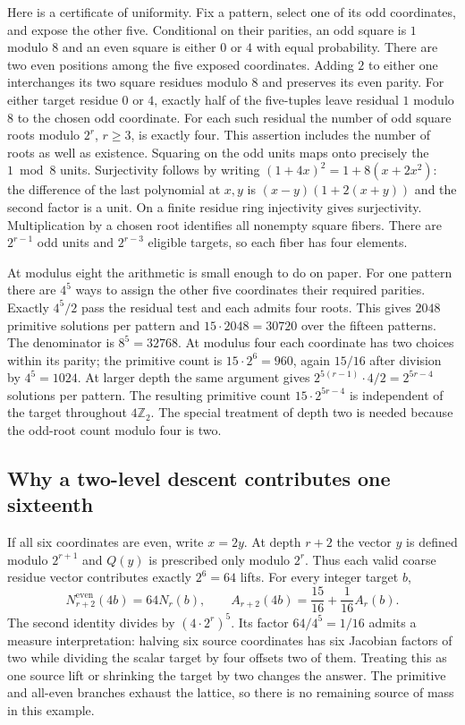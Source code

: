 \documentclass[12pt,letterpaper]{article}
\begin{document}
Here is a certificate of uniformity. Fix a pattern, select one of its odd coordinates, and expose the other five. Conditional on their parities, an odd square is $1$ modulo $8$ and an even square is either $0$ or $4$ with equal probability. There are two even positions among the five exposed coordinates. Adding $2$ to either one interchanges its two square residues modulo $8$ and preserves its even parity. For either target residue $0$ or $4$, exactly half of the five-tuples leave residual $1$ modulo $8$ to the chosen odd coordinate. For each such residual the number of odd square roots modulo $2^r$, $r\ge3$, is exactly four. This assertion includes the number of roots as well as existence. Squaring on the odd units maps onto precisely the $1\bmod8$ units. Surjectivity follows by writing $(1+4x)^2=1+8(x+2x^2)$: the difference of the last polynomial at $x,y$ is $(x-y)(1+2(x+y))$ and the second factor is a unit. On a finite residue ring injectivity gives surjectivity. Multiplication by a chosen root identifies all nonempty square fibers. There are $2^{r-1}$ odd units and $2^{r-3}$ eligible targets, so each fiber has four elements.

At modulus eight the arithmetic is small enough to do on paper. For one pattern there are $4^5$ ways to assign the other five coordinates their required parities. Exactly $4^5/2$ pass the residual test and each admits four roots. This gives $2048$ primitive solutions per pattern and $15\cdot2048=30720$ over the fifteen patterns. The denominator is $8^5=32768$. At modulus four each coordinate has two choices within its parity; the primitive count is $15\cdot2^6=960$, again $15/16$ after division by $4^5=1024$. At larger depth the same argument gives $2^{5(r-1)}\cdot4/2=2^{5r-4}$ solutions per pattern. The resulting primitive count $15\cdot2^{5r-4}$ is independent of the target throughout $4\mathbb Z_2$. The special treatment of depth two is needed because the odd-root count modulo four is two.

\subsection{Why a two-level descent contributes one sixteenth}
If all six coordinates are even, write $x=2y$. At depth $r+2$ the vector $y$ is defined modulo $2^{r+1}$ and $Q(y)$ is prescribed only modulo $2^r$. Thus each valid coarse residue vector contributes exactly $2^6=64$ lifts. For every integer target $b$,
\[
 N^{\mathrm{even}}_{r+2}(4b)=64N_r(b),\qquad
 A_{r+2}(4b)=\frac{15}{16}+\frac{1}{16}A_r(b).
\]
The second identity divides by $(4\cdot2^r)^5$. Its factor $64/4^5=1/16$ admits a measure interpretation: halving six source coordinates has six Jacobian factors of two while dividing the scalar target by four offsets two of them. Treating this as one source lift or shrinking the target by two changes the answer. The primitive and all-even branches exhaust the lattice, so there is no remaining source of mass in this example.
\end{document}
